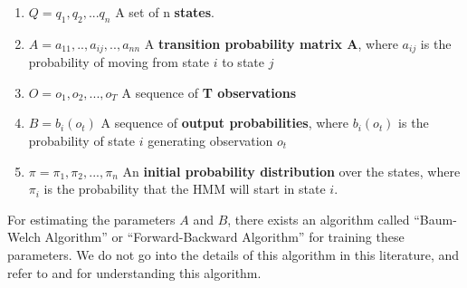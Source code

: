 
   \begin{enumerate}
   	\item $Q=q_1,q_2,...q_n$ \quad \quad \quad \quad A set of n \textbf{states}.
   	\item $A=a_{11},..,a_{ij},..,a_{nn}$ \quad \quad A \textbf{transition probability matrix A}, where $a_{ij}$ is the probability of moving from state $i$ to state $j$
   	\item $O=o_1,o_2,...,o_T$ \quad \quad \quad \quad A sequence of \textbf{T observations}
   	\item $B=b_i(o_t)$ \quad \quad \quad \quad \quad \quad \quad A sequence of \textbf{output probabilities}, where $b_i(o_t)$ is the probability of state $i$ generating observation $o_t$
   	\item $\pi = \pi_1,\pi_2,...,\pi_n$ \quad \quad \quad \quad An \textbf{initial probability distribution} over the states, where $\pi_i$ is the probability that the \ac{HMM} will start in state $i$.
   	 \cite{keselj2009speech} \cite{rabiner1989tutorial}
   	 
   \end{enumerate}



For estimating the parameters $A$ and $B$, there exists an algorithm called \enquote{Baum-Welch Algorithm} or \enquote{Forward-Backward Algorithm} for training these parameters. We do not go into the details of this algorithm in this literature, and refer to \cite{keselj2009speech} and \cite{baum1972inequality} for understanding this algorithm. 

